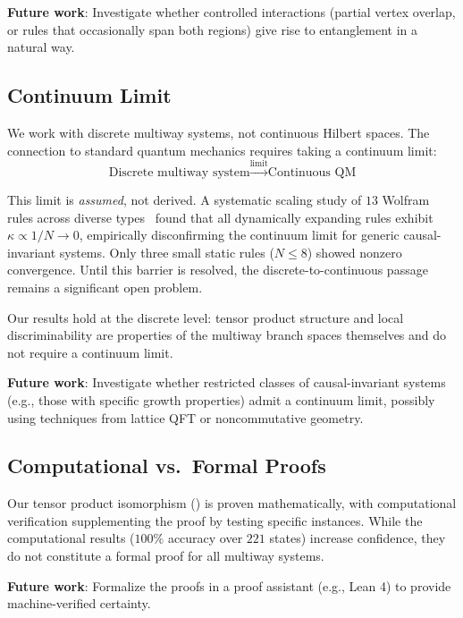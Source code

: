 \documentclass[11pt,a4paper]{article}
\theoremstyle{definition}
\theoremstyle{remark}
\begin{document}
\textbf{Future work}: Investigate whether controlled interactions
(partial vertex overlap, or rules that occasionally span both regions)
give rise to entanglement in a natural way.

\subsection{Continuum Limit}

We work with discrete multiway systems, not continuous Hilbert spaces.
The connection to standard quantum mechanics requires taking a continuum
limit:
\begin{equation}
\text{Discrete multiway system} \xrightarrow{\text{limit}}
\text{Continuous QM}
\end{equation}

This limit is \textit{assumed}, not derived. A systematic scaling study
of $13$ Wolfram rules across diverse types~\cite{companion_lovelock}
found that all dynamically expanding rules exhibit $\kappa \propto 1/N
\to 0$, empirically disconfirming the continuum limit for generic
causal-invariant systems. Only three small static rules ($N \leq 8$)
showed nonzero convergence. Until this barrier is resolved, the
discrete-to-continuous passage remains a significant open problem.

Our results hold at the discrete level: tensor product structure and
local discriminability are properties of the multiway branch spaces
themselves and do not require a continuum limit.

\textbf{Future work}: Investigate whether restricted classes of
causal-invariant systems (e.g., those with specific growth properties)
admit a continuum limit, possibly using techniques from lattice QFT or
noncommutative geometry.

\subsection{Computational vs.\ Formal Proofs}

Our tensor product isomorphism () is proven
mathematically, with computational verification supplementing the proof
by testing specific instances. While the computational results ($100\%$
accuracy over $221$ states) increase confidence, they do not constitute
a formal proof for all multiway systems.

\textbf{Future work}: Formalize the proofs in a proof assistant (e.g.,
Lean 4) to provide machine-verified certainty.
\end{document}
